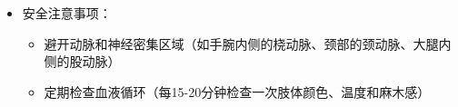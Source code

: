 \documentclass[12pt,UTF8]{ctexbook}
\begin{document}
\begin{itemize}
\begin{itemize}
\begin{itemize}
\begin{itemize}
        \item \textbf{项圈}：
          \item 类型：皮革项圈、金属项圈、可调节项圈
          \item 安全要点：选择有安全扣的项圈，避免使用带锁且无钥匙的项圈；确保能插入2-3根手指
          \item 风险提示：避免压迫颈部动脉和气管，防止窒息风险
        \end{itemize}
      \item \textbf{辅助工具}：
        \begin{itemize}
        \item \textbf{束缚带}：
          \item 类型：魔术贴束缚带、带扣束缚带、可调节束缚带
          \item 安全要点：选择宽度足够的束缚带（至少5cm），避免局部压力过大；确保有快速释放功能
          \item 适用场景：初学者使用，快速捆绑，温柔场景
        \item \textbf{分腿器}：
          \item 类型：固定角度分腿器、可调节分腿器
          \item 安全要点：选择重量适中的分腿器，避免使用过重导致关节损伤；确保底部有防滑设计
          \item 风险提示：避免过度打开双腿，防止髋关节损伤
        \item \textbf{眼罩}：
          \item 类型：柔软眼罩、皮革眼罩、带填充眼罩
          \item 安全要点：确保透气性良好，避免长时间佩戴；选择有快速释放功能的眼罩
          \item 作用：增强其他感官体验，增加神秘感
        \item \textbf{口塞}：
          \item 类型：硅胶口塞、橡胶口塞、带孔口塞
          \item 安全要点：选择大小合适的口塞，确保佩戴者能正常呼吸；使用前消毒；定期检查佩戴者状态
          \item 风险提示：避免使用无孔口塞，防止窒息风险；避免长时间佩戴导致口腔肌肉疲劳
        \end{itemize}
      \end{itemize}
    \item 安全注意事项：
      \begin{itemize}
      \item 避开动脉和神经密集区域（如手腕内侧的桡动脉、颈部的颈动脉、大腿内侧的股动脉）
      \item 定期检查血液循环（每15-20分钟检查一次肢体颜色、温度和麻木感）

\end{itemize}
\end{itemize}
\end{itemize}
\end{document}
